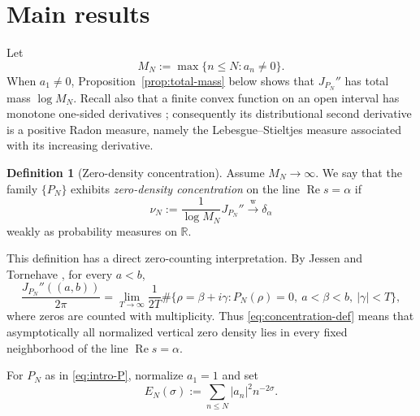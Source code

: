 \documentclass[11pt]{article}
\theoremstyle{definition}
\newtheorem{definition}[theorem]{Definition}
\newcommand{\R}{\mathbb R}
\newcommand{\Ree}{\operatorname{Re}}
\newcommand{\1}{\mathbf 1}
\begin{document}
\section{Main results}\label{sec:main-results}

Let
\begin{equation}\label{eq:MN-intro}
M_N:=\max\{n\le N:a_n\neq0\}.
\end{equation}
When $a_1\neq0$, Proposition~\ref{prop:total-mass} below shows that $J_{P_N}''$ has total mass $\log M_N$.  Recall also that a finite convex function on an open interval has monotone one-sided derivatives \cite[Theorem~24.1]{Rockafellar1970}; consequently its distributional second derivative is a positive Radon measure, namely the Lebesgue--Stieltjes measure associated with its increasing derivative.

\begin{definition}[Zero-density concentration]\label{def:concentration}
Assume $M_N\to\infty$.  We say that the family $\{P_N\}$ exhibits \emph{zero-density concentration} on the line $\Ree s=\alpha$ if
\begin{equation}\label{eq:concentration-def}
\nu_N:=\frac{1}{\log M_N}J_{P_N}''
\xrightarrow{\mathrm w} \delta_\alpha
\end{equation}
weakly as probability measures on $\R$.
\end{definition}

This definition has a direct zero-counting interpretation.
By Jessen and Tornehave \cite[Theorem~31]{JessenTornehave1945},
for every $a<b$,
\begin{equation}\label{eq:JT-main-intro}
\frac{J_{P_N}''((a,b))}{2\pi}
=
\lim_{T\to\infty}\frac1{2T}
\#\{\rho=\beta+i\gamma:P_N(\rho)=0,\ 
a<\beta<b,\ |\gamma|<T\},
\end{equation}
where zeros are counted with multiplicity.
Thus \eqref{eq:concentration-def} means that asymptotically all normalized vertical zero density lies in every fixed neighborhood of the line $\Ree s=\alpha$.

For $P_N$ as in \eqref{eq:intro-P}, normalize $a_1=1$ and set
\begin{equation}\label{eq:global-energy-intro}
E_N(\sigma):=\sum_{n\le N}|a_n|^2n^{-2\sigma}.
\end{equation}
\end{document}
